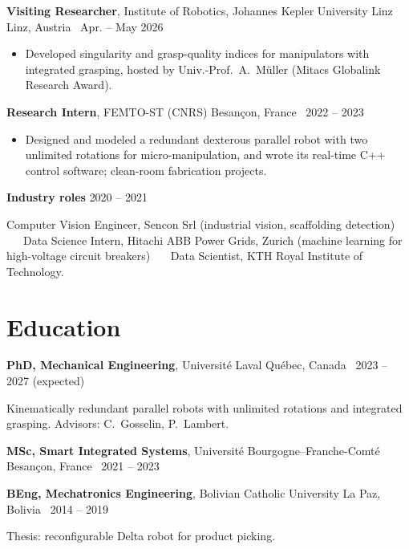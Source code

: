 \documentclass[10pt,a4paper]{article}
\newcommand{\role}[4]{\textbf{#1}, #2 \hfill {\color{muted}#3 \textbar\ #4}\par}
\begin{document}
\vspace{3pt}
\role{Visiting Researcher}{Institute of Robotics, Johannes Kepler University Linz}{Linz, Austria}{Apr. -- May 2026}
\begin{itemize}
\item Developed singularity and grasp-quality indices for manipulators with integrated grasping, hosted by Univ.-Prof.~A.~M\"uller (Mitacs Globalink Research Award).
\end{itemize}

\vspace{3pt}
\role{Research Intern}{FEMTO-ST (CNRS)}{Besan\c{c}on, France}{2022 -- 2023}
\begin{itemize}
\item Designed and modeled a redundant dexterous parallel robot with two unlimited rotations for micro-manipulation, and wrote its real-time C++ control software; clean-room fabrication projects.
\end{itemize}

\vspace{3pt}
\textbf{Industry roles} \hfill {\color{muted}2020 -- 2021}\par
{\small Computer Vision Engineer, Sencon Srl (industrial vision, scaffolding detection) \ \textbullet\ \ Data Science
Intern, Hitachi ABB Power Grids, Zurich (machine learning for high-voltage circuit breakers) \ \textbullet\ \ Data
Scientist, KTH Royal Institute of Technology.}

\section{Education}
\textbf{PhD, Mechanical Engineering}, Universit\'e Laval \hfill {\color{muted}Qu\'ebec, Canada \textbar\ 2023 -- 2027 (expected)}\par
{\small Kinematically redundant parallel robots with unlimited rotations and integrated grasping. Advisors: C.~Gosselin, P.~Lambert.}\par\vspace{2pt}
\textbf{MSc, Smart Integrated Systems}, Universit\'e Bourgogne--Franche-Comt\'e \hfill {\color{muted}Besan\c{c}on, France \textbar\ 2021 -- 2023}\par\vspace{2pt}
\textbf{BEng, Mechatronics Engineering}, Bolivian Catholic University \hfill {\color{muted}La Paz, Bolivia \textbar\ 2014 -- 2019}\par
{\small Thesis: reconfigurable Delta robot for product picking.}
\end{document}
